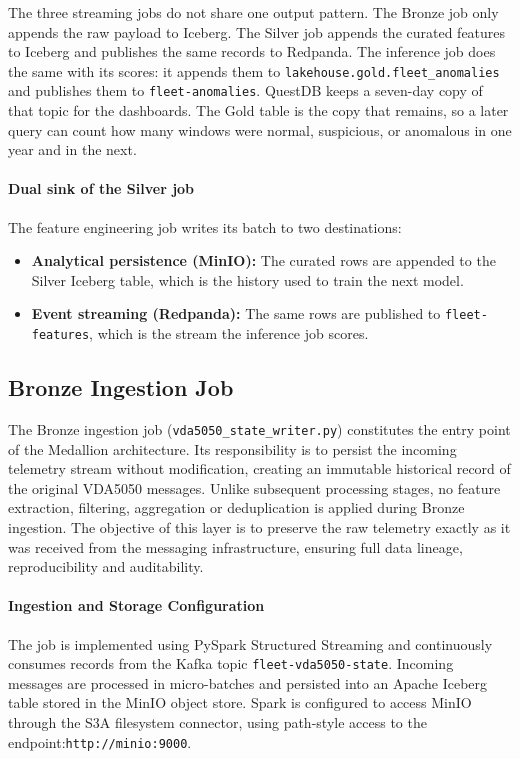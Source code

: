   The three streaming jobs do not share one output pattern. The Bronze job only appends the raw payload to Iceberg. The Silver job appends the curated features to Iceberg and publishes the same records to Redpanda. The inference job does the same with its scores: it appends them to \texttt{lakehouse.gold.fleet\_anomalies} and publishes them to \texttt{fleet-anomalies}. QuestDB keeps a seven-day copy of that topic for the dashboards. The Gold table is the copy that remains, so a later query can count how many windows were normal, suspicious, or anomalous in one year and in the next.

  \paragraph{Dual sink of the Silver job} The feature engineering job writes its batch to two destinations:
    \begin{itemize}
      \item \textbf{Analytical persistence (MinIO):} The curated rows are appended to the Silver Iceberg table, which is the history used to train the next model.
      \item \textbf{Event streaming (Redpanda):} The same rows are published to \texttt{fleet-features}, which is the stream the inference job scores.
    \end{itemize}

\subsection{Bronze Ingestion Job} \label{subsec:bronze-ingestion-job} 
The Bronze ingestion job (\texttt{vda5050\_state\_writer.py}) constitutes the entry point of the Medallion architecture. 
Its responsibility is to persist the incoming telemetry stream without modification, creating an immutable historical record of the original VDA5050 messages.
Unlike subsequent processing stages, no feature extraction, filtering, aggregation or deduplication is applied during Bronze ingestion. 
The objective of this layer is to preserve the raw telemetry exactly as it was received from the messaging infrastructure, ensuring full data lineage, reproducibility and auditability. 
\paragraph{Ingestion and Storage Configuration} The job is implemented using PySpark Structured Streaming and continuously consumes records from the Kafka topic \texttt{fleet-vda5050-state}. 
Incoming messages are processed in micro-batches and persisted into an Apache Iceberg table stored in the MinIO object store.
Spark is configured to access MinIO through the S3A filesystem connector, using path-style access to the endpoint:\texttt{http://minio:9000}.

